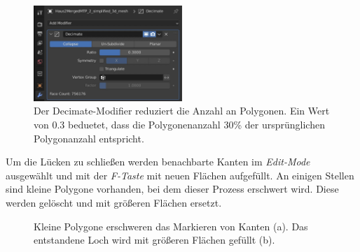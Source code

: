 \begin{figure}[hbt!]
    \centering
    \includegraphics[width=0.5\textwidth]{img/vorbereitungen_blender_modelle/blender_decimate.jpg}
    \caption{Der Decimate-Modifier reduziert die Anzahl an Polygonen. Ein Wert von 0.3 beduetet, dass die Polygonenanzahl 30\% der ursprünglichen Polygonanzahl entspricht.}
    \label{fig:blender_decimate_modifier}
\end{figure}

Um die Lücken zu schließen werden benachbarte Kanten im \textit{Edit-Mode} ausgewählt und mit der \textit{F-Taste} mit neuen Flächen aufgefüllt. An einigen Stellen sind kleine Polygone vorhanden, bei dem dieser Prozess erschwert wird. Diese werden gelöscht und mit größeren Flächen ersetzt.  

\begin{figure}[hbt!]
    \centering
    \qquad
    \caption{Kleine Polygone erschweren das Markieren von Kanten (a). Das entstandene Loch wird mit größeren Flächen gefüllt (b).}%
    \label{fig:blender_kleine_polygone}
\end{figure}

